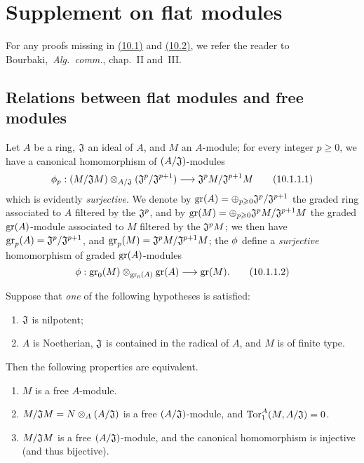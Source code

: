 \section{Supplement on flat modules}
\label{section:0.10}

For any proofs missing in \hyperref[subsection:0.10.1]{(10.1)} and \hyperref[subsection:0.10.2]{(10.2)}, we refer the reader to Bourbaki,~\emph{Alg.~comm.}, chap.~II and~III.

\subsection{Relations between flat modules and free modules}
\label{subsection:0.10.1}

\begin{env}[10.1.1]
\label{0.10.1.1}
Let $A$ be a ring, $\mathfrak{J}$ an ideal of $A$, and $M$ an $A$-module;
for every integer $p\geq0$, we have a canonical homomorphism of $(A/\mathfrak{J})$-modules
\[
\label{0.10.1.1.1}
    \vphi_p: (M/\fk{J}M) \otimes_{A/\fk{J}} (\fk{J}^p/\fk{J}^{p+1}) \to \fk{J}^pM/\fk{J}^{p+1}M\tag{10.1.1.1}
\]
which is evidently \emph{surjective}.
We denote by ${\mathop{\mathrm{gr}}\nolimits}(A)=\oplus_{p\geqslant0}\mathfrak{J}^p/\mathfrak{J}^{p+1}$ the graded ring associated to $A$ filtered by the $\mathfrak{J}^p$, and by ${\mathop{\mathrm{gr}}\nolimits}(M)=\oplus_{p\geqslant0}\mathfrak{J}^pM/\mathfrak{J}^{p+1}M$ the graded ${\mathop{\mathrm{gr}}\nolimits}(A)$-module associated to $M$ filtered by the $\mathfrak{J}^pM$;
we then have ${\mathop{\mathrm{gr}}\nolimits}_p(A)=\mathfrak{J}^p/\mathfrak{J}^{p+1}$, and ${\mathop{\mathrm{gr}}\nolimits}_p(M)=\mathfrak{J}^pM/\mathfrak{J}^{p+1}M$;
the $\phi$ define a \emph{surjective} homomorphism of graded ${\mathop{\mathrm{gr}}\nolimits}(A)$-modules
\[
\label{eq:0.10.1.1.2}
  \vphi:\gr_0(M)\otimes_{\gr_0(A)}\gr(A)\to\gr(M).
  \tag{10.1.1.2}
\]
\end{env}

\begin{env}[10.1.2]
\label{0.10.1.2}
Suppose that \emph{one} of the following hypotheses is satisfied:
\begin{enumerate}[label=\emph{(\roman*)}]
  \item $\mathfrak{J}$ is nilpotent;
  \item $A$ is Noetherian, $\mathfrak{J}$ is contained in the radical of $A$, and $M$ is of finite type.
\end{enumerate}
Then the following properties are equivalent.
\begin{enumerate}[label=\emph{(\alph*)}]
  \item $M$ is a free $A$-module.
  \item $M/\mathfrak{J}M=N\otimes_A(A/\mathfrak{J})$ is a free $(A/\mathfrak{J})$-module, and ${\mathop{\mathrm{Tor}}\nolimits}_1^A(M,A/\mathfrak{J})=0$.
  \item $M/\mathfrak{J}M$ is a free $(A/\mathfrak{J})$-module, and the canonical homomorphism  is injective (and thus bijective).
\end{enumerate}
\end{env}

